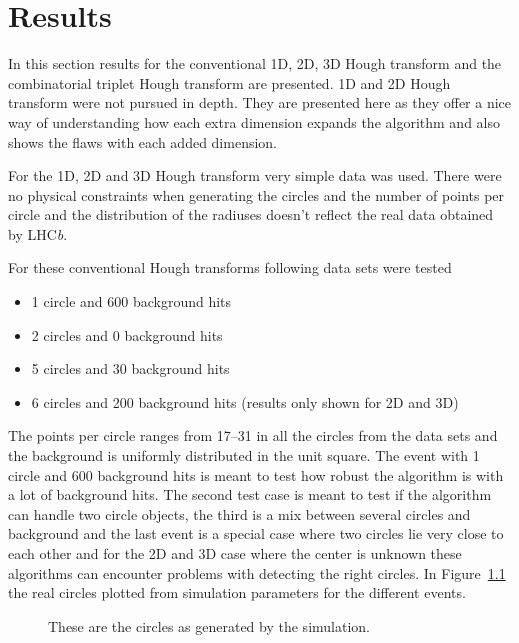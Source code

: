 \documentclass[11pt,twoside]{scrreprt}
\begin{document}
\chapter{Results}
\label{cha:results}
In this section results for the conventional 1D, 2D, 3D Hough transform and 
the combinatorial triplet Hough transform are presented. 1D and 2D Hough transform
were not pursued in depth. They are presented here as they offer a nice
way of understanding how each extra dimension expands the algorithm and also
shows the flaws with each added dimension.

For the 1D, 2D and 3D Hough transform very simple data was used. There were 
no physical constraints when generating the circles and the number of points
per circle and the distribution of the radiuses doesn't reflect the real data obtained
by LHC\textit{b}.

For these conventional Hough transforms following data sets were tested

\begin{itemize}
  \item 1 circle and 600 background hits
  \item 2 circles and 0 background hits
  \item 5 circles and 30 background hits
  \item 6 circles and 200 background hits (results only shown for 2D and 3D)
\end{itemize}


The points per circle ranges from 17--31 in all the circles from the data sets
and the background is uniformly distributed in the unit square. The event with 1
circle and 600 background hits is meant to test how robust the algorithm is with a 
lot of background hits. The second test case is meant to test if the algorithm can handle
two circle objects, the third is a mix between several circles and background and the last
event is a special case where two circles lie very close to each other and for the 2D
and 3D case where the center is unknown these algorithms can encounter problems with
detecting the right circles. In Figure~\ref{fig:real_ht_results}
the real circles plotted from simulation parameters for the different events.

\begin{figure}
\centering
                \label{fig:real_1c600bg}%
                \label{fig:real_2c0bg}

                \label{fig:real_5c30bg}%
                \label{fig:real_6c_200bg}%
        \caption{These are the circles as generated by the simulation.\label{fig:real_ht_results}}
\end{figure}
\end{document}
